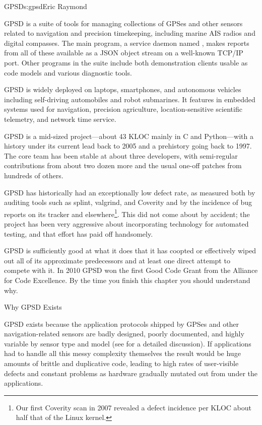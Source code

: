 \begin{aosachapter}{GPSD}{s:gpsd}{Eric Raymond}

GPSD is a suite of tools for managing collections of GPSes and other
sensors related to navigation and precision timekeeping, including
marine AIS radios and digital compasses. The main program, a service
daemon named , makes reports from all of these available
as a JSON object stream on a well-known TCP/IP port.  Other programs
in the suite include both demonstration clients usable as code
models and various diagnostic tools. 

GPSD is widely deployed on laptops, smartphones, and autonomous
vehicles including self-driving automobiles and robot submarines. It
features in embedded systems used for navigation, precision
agriculture, location-sensitive scientific telemetry, and network time
service.

GPSD is a mid-sized project---about 43 KLOC mainly in C and
Python---with a history under its current lead back to 2005 and a
prehistory going back to 1997.  The core team has been stable at about
three developers, with semi-regular contributions from about two dozen
more and the usual one-off patches from hundreds of others.

GPSD has historically had an exceptionally low defect rate, as
measured both by auditing tools such as splint, valgrind, and Coverity
and by the incidence of bug reports on its tracker and
elsewhere\footnote{Our first Coverity scan in 2007 revealed a defect
incidence per KLOC about half that of the Linux kernel.}.  This did
not come about by accident; the project has been very aggressive about
incorporating technology for automated testing, and that effort has
paid off handsomely.

GPSD is sufficiently good at what it does that it has coopted or
effectively wiped out all of its approximate predecessors and at least
one direct attempt to compete with it.  In 2010 GPSD won the first
Good Code Grant from the Alliance for Code Excellence.  By the time
you finish this chapter you should understand why.

\begin{aosasect1}{Why GPSD Exists}

GPSD exists because the application protocols shipped by GPSes and
other navigation-related sensors are badly designed, poorly
documented, and highly variable by sensor type and model (see
\cite{bib:gps-suck} for a detailed discussion). If applications had to
handle all this messy complexity themselves the result would be huge
amounts of brittle and duplicative code, leading to high rates of
user-visible defects and constant problems as hardware gradually
mutated out from under the applications.


\end{aosasect1}
\end{aosachapter}
